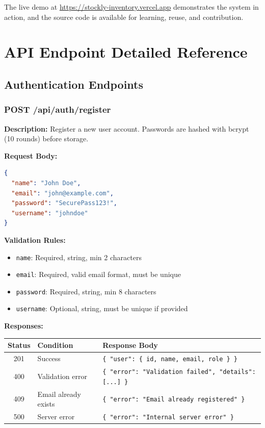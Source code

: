 ﻿\documentclass[12pt,a4paper]{report}
\begin{document}
The live demo at \url{https://stockly-inventory.vercel.app} demonstrates the system in action, and the source code is available for learning, reuse, and contribution.


\appendix
\chapter{API Endpoint Detailed Reference}

\section{Authentication Endpoints}

\subsection{POST /api/auth/register}

\textbf{Description:} Register a new user account. Passwords are hashed with bcrypt (10 rounds) before storage.

\textbf{Request Body:}
\begin{lstlisting}[language=JSON,caption={Register request body}]
{
  "name": "John Doe",
  "email": "john@example.com",
  "password": "SecurePass123!",
  "username": "johndoe"
}
\end{lstlisting}

\textbf{Validation Rules:}
\begin{itemize}[leftmargin=1.5em]
  \item \texttt{name}: Required, string, min 2 characters
  \item \texttt{email}: Required, valid email format, must be unique
  \item \texttt{password}: Required, string, min 8 characters
  \item \texttt{username}: Optional, string, must be unique if provided
\end{itemize}

\textbf{Responses:}
\begin{center}
\begin{tabular}{clp{7cm}}
  \toprule
  \textbf{Status} & \textbf{Condition} & \textbf{Response Body} \\
  \midrule
  201 & Success & \texttt{\{ "user": \{ id, name, email, role \} \}} \\
  400 & Validation error & \texttt{\{ "error": "Validation failed", "details": [...] \}} \\
  409 & Email already exists & \texttt{\{ "error": "Email already registered" \}} \\
  500 & Server error & \texttt{\{ "error": "Internal server error" \}} \\
  \bottomrule
\end{tabular}
\end{center}
\end{document}
